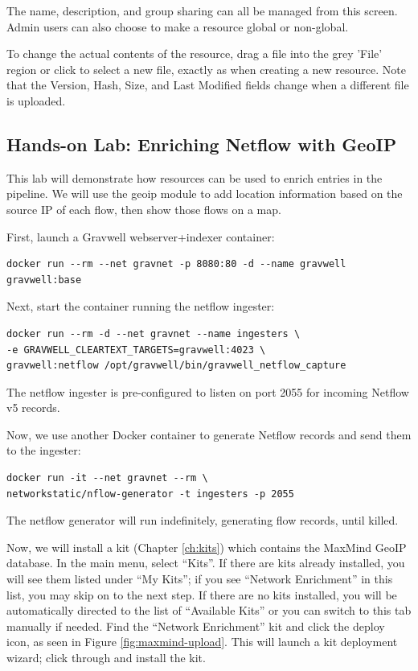 The name, description, and group sharing can all be managed from this
screen. Admin users can also choose to make a resource global or
non-global.

To change the actual contents of the resource, drag a file into the
grey 'File' region or click to select a new file, exactly as when
creating a new resource. Note that the Version, Hash, Size, and Last
Modified fields change when a different file is uploaded.

\clearpage
\subsection{Hands-on Lab: Enriching Netflow with GeoIP}

This lab will demonstrate how resources can be used to enrich entries
in the pipeline. We will use the geoip module to add location
information based on the source IP of each flow, then show those flows
on a map.

First, launch a Gravwell webserver+indexer container:

\begin{Verbatim}[breaklines=true]
docker run --rm --net gravnet -p 8080:80 -d --name gravwell gravwell:base
\end{Verbatim}

Next, start the  container running the netflow ingester:

\begin{Verbatim}[breaklines=true]
docker run --rm -d --net gravnet --name ingesters \
-e GRAVWELL_CLEARTEXT_TARGETS=gravwell:4023 \
gravwell:netflow /opt/gravwell/bin/gravwell_netflow_capture
\end{Verbatim}

The netflow ingester is pre-configured to listen on port 2055 for
incoming Netflow v5 records.

Now, we use another Docker container to generate Netflow records and
send them to the ingester:

\begin{Verbatim}[breaklines=true]
docker run -it --net gravnet --rm \
networkstatic/nflow-generator -t ingesters -p 2055
\end{Verbatim}

The netflow generator will run indefinitely, generating flow records,
until killed.

Now, we will install a kit (Chapter \ref{ch:kits}) which contains the MaxMind GeoIP database. In the main menu, select ``Kits''. If there are kits already installed, you will see them listed under ``My Kits''; if you see ``Network Enrichment'' in this list, you may skip on to the next step. If there are no kits installed, you will be automatically directed to the list of ``Available Kits'' or you can switch to this tab manually if needed. Find the ``Network Enrichment'' kit and click the deploy icon, as seen in Figure \ref{fig:maxmind-upload}. This will launch a kit deployment wizard; click through and install the kit.

